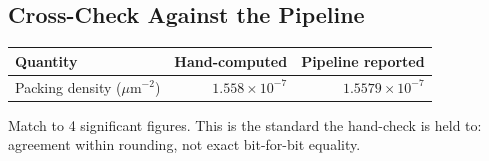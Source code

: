 \subsection{Cross-Check Against the Pipeline}
\begin{center}
\begin{tabular}{lrr}
\toprule
Quantity & Hand-computed & Pipeline reported \\
\midrule
Packing density ($\mu$m$^{-2}$) & $1.558\times10^{-7}$ & $1.5579\times10^{-7}$ \\
\bottomrule
\end{tabular}
\end{center}
Match to 4 significant figures. This is the standard the hand-check is held
to: agreement within rounding, not exact bit-for-bit equality.

\newpage
